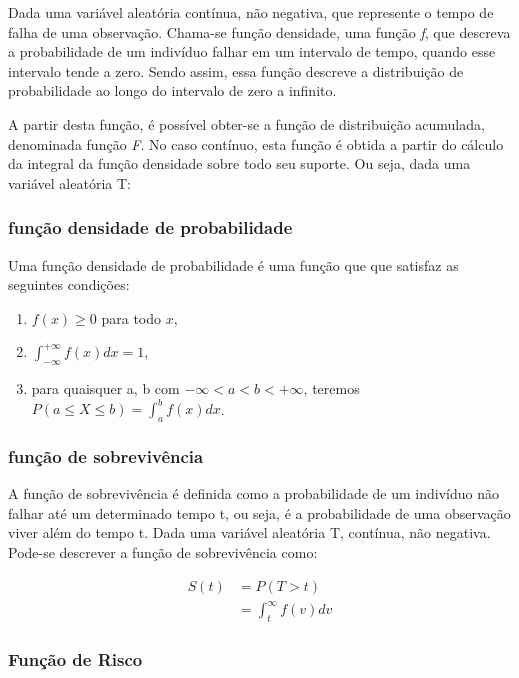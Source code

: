 \documentclass[a4paper,12pt]{article}
\begin{document}
Dada uma variável aleatória contínua, não negativa, que represente o tempo de falha de uma observação. Chama-se função densidade, uma função \textit{f}, que descreva a probabilidade de um indivíduo falhar em um intervalo de tempo, quando esse intervalo tende a zero. Sendo assim, essa função descreve a distribuição de probabilidade ao longo do intervalo de zero a infinito.

A partir desta função, é possível obter-se a função de distribuição acumulada, denominada função \textit{F}. No caso contínuo, esta função é obtida a partir do cálculo da integral da função densidade sobre todo seu suporte. Ou seja, dada uma variável aleatória T:

\subsubsection{função densidade de probabilidade}

Uma função densidade de probabilidade é uma função que que satisfaz as seguintes condições:%

\begin{enumerate}

	\item $f(x) \ge 0$ para todo $x$,
	\item $\int_{-\infty}^{+\infty} f(x)dx = 1$,
	\item para quaisquer a, b com $-\infty < a < b < +\infty$, teremos $P(a \le X \le b) = \int_a^b f(x)dx$.
\end{enumerate}
	 
		
\subsubsection{função de sobrevivência}

A função de sobrevivência é definida como a probabilidade de um indivíduo não falhar até um determinado tempo t, ou seja, é a probabilidade de uma observação viver além do tempo t. Dada uma variável aleatória T, contínua, não negativa. Pode-se descrever a função de sobrevivência como:

\begin{equation}
\label{eq}
	\begin{split}
		S(t) & = P(T > t) \\
		& = \int_t^{\infty} f(v)dv 
  	\end{split}
\end{equation} 

\subsubsection{Função de Risco}
\end{document}
